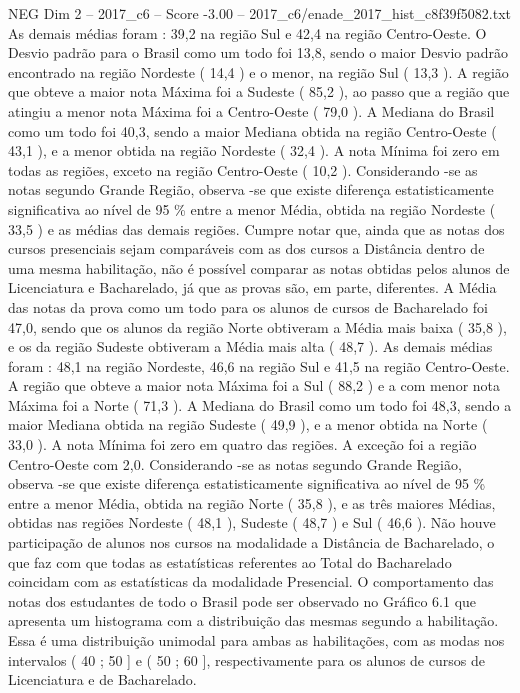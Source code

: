 \begin{textsample}{NEG Dim 2 – 2017\_c6 – Score -3.00 – 2017\_c6/enade\_2017\_hist\_c8f39f5082.txt}
As demais médias foram : 39,2 na região Sul e 42,4 na região Centro-Oeste.
O Desvio padrão para o Brasil como um todo foi 13,8, sendo o maior Desvio padrão encontrado na região Nordeste ( 14,4 ) e o menor, na região Sul ( 13,3 ).
A região que obteve a maior nota Máxima foi a Sudeste ( 85,2 ), ao passo que a região que atingiu a menor nota Máxima foi a Centro-Oeste ( 79,0 ).
A Mediana do Brasil como um todo foi 40,3, sendo a maior Mediana obtida na região Centro-Oeste ( 43,1 ), e a menor obtida na região Nordeste ( 32,4 ).
A nota Mínima foi zero em todas as regiões, exceto na região Centro-Oeste ( 10,2 ).
Considerando -se as notas segundo Grande Região, observa -se que existe diferença estatisticamente significativa ao nível de 95 \% entre a menor Média, obtida na região Nordeste ( 33,5 ) e as médias das demais regiões.
Cumpre notar que, ainda que as notas dos cursos presenciais sejam comparáveis com as dos cursos a Distância dentro de uma mesma habilitação, não é possível comparar as notas obtidas pelos alunos de Licenciatura e Bacharelado, já que as provas são, em parte, diferentes.
A Média das notas da prova como um todo para os alunos de cursos de Bacharelado foi 47,0, sendo que os alunos da região Norte obtiveram a Média mais baixa ( 35,8 ), e os da região Sudeste obtiveram a Média mais alta ( 48,7 ).
As demais médias foram : 48,1 na região Nordeste, 46,6 na região Sul e 41,5 na região Centro-Oeste.
A região que obteve a maior nota Máxima foi a Sul ( 88,2 ) e a com menor nota Máxima foi a Norte ( 71,3 ).
A Mediana do Brasil como um todo foi 48,3, sendo a maior Mediana obtida na região Sudeste ( 49,9 ), e a menor obtida na Norte ( 33,0 ).
A nota Mínima foi zero em quatro das regiões.
A exceção foi a região Centro-Oeste com 2,0.
Considerando -se as notas segundo Grande Região, observa -se que existe diferença estatisticamente significativa ao nível de 95 \% entre a menor Média, obtida na região Norte ( 35,8 ), e as três maiores Médias, obtidas nas regiões Nordeste ( 48,1 ), Sudeste ( 48,7 ) e Sul ( 46,6 ).
Não houve participação de alunos nos cursos na modalidade a Distância de Bacharelado, o que faz com que todas as estatísticas referentes ao Total do Bacharelado coincidam com as estatísticas da modalidade Presencial.
O comportamento das notas dos estudantes de todo o Brasil pode ser observado no Gráfico 6.1 que apresenta um histograma com a distribuição das mesmas segundo a habilitação.
Essa é uma distribuição unimodal para ambas as habilitações, com as modas nos intervalos ( 40 ; 50 ] e ( 50 ; 60 ], respectivamente para os alunos de cursos de Licenciatura e de Bacharelado.

\end{textsample}
